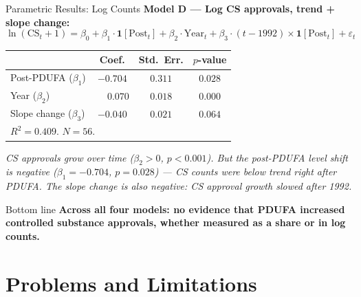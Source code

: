 \documentclass[10pt]{beamer}
\begin{document}
\begin{frame}[t]{Parametric Results: Log Counts}
  \textbf{Model D --- Log CS approvals, trend + slope change:}
  \[
    \ln(\text{CS}_t + 1) = \beta_0 + \beta_1 \cdot \mathbf{1}[\text{Post}_t]
                           + \beta_2 \cdot \text{Year}_t
                           + \beta_3 \cdot (t - 1992) \times \mathbf{1}[\text{Post}_t]
                           + \varepsilon_t
  \]
  \begin{center}
  \begin{tabular}{lccc}
    \hline
    & Coef. & Std.\ Err. & $p$-value \\
    \hline
    Post-PDUFA ($\beta_1$)  & $-0.704$ & $0.311$ & $0.028$ \\
    Year ($\beta_2$)         & $\phantom{-}0.070$ & $0.018$ & $0.000$ \\
    Slope change ($\beta_3$) & $-0.040$ & $0.021$ & $0.064$ \\
    \hline
    \multicolumn{4}{l}{$R^2 = 0.409$. $N = 56$.} \\
  \end{tabular}
  \end{center}

  \medskip
  \textit{CS approvals grow over time ($\beta_2 > 0$, $p < 0.001$). But the
  post-PDUFA level shift is \textit{negative} ($\beta_1 = -0.704$, $p = 0.028$)
  --- CS counts were \textit{below} trend right after PDUFA. The slope change
  is also negative: CS approval growth \textit{slowed} after 1992.}

  \medskip
  \begin{block}{Bottom line}
    \textbf{Across all four models: no evidence that PDUFA increased controlled
    substance approvals, whether measured as a share or in log counts.}
  \end{block}
\end{frame}

\section{Problems and Limitations}
\end{document}

